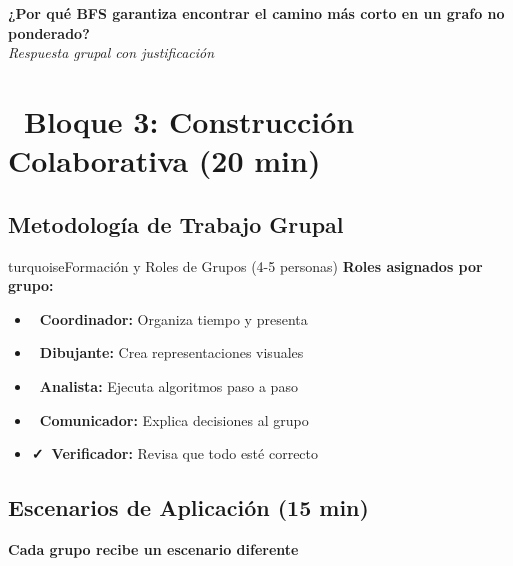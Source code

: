 \documentclass[12pt,a4paper]{article}
\begin{document}
	\textbf{¿Por qué BFS garantiza encontrar el camino más corto en un grafo no ponderado?}\\
	\textit{Respuesta grupal con justificación}
	
	\newpage
	
	\section*{\faUsers\ Bloque 3: Construcción Colaborativa (20 min)}
	
	
	\subsection*{Metodología de Trabajo Grupal}
	
	\begin{presentationbox}{turquoise}{Formación y Roles de Grupos (4-5 personas)}
		\textbf{Roles asignados por grupo:}
		\begin{itemize}
			\item \textbf{\faUserTie\ Coordinador:} Organiza tiempo y presenta
			\item \textbf{\faPen\ Dibujante:} Crea representaciones visuales
			\item \textbf{\faCalculator\ Analista:} Ejecuta algoritmos paso a paso
			\item \textbf{\faComments\ Comunicador:} Explica decisiones al grupo
			\item \textbf{\faCheck\ Verificador:} Revisa que todo esté correcto
		\end{itemize}
	\end{presentationbox}
	
	\subsection*{Escenarios de Aplicación (15 min)}
	
	\begin{center}
		\textbf{Cada grupo recibe un escenario diferente}
	\end{center}
	
\end{document}
